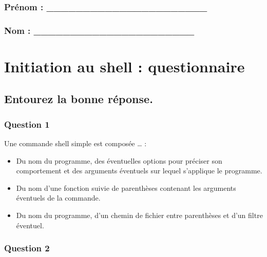 \documentclass[
]{article}
\date{}
\providecommand{\tightlist}{%
  \setlength{\itemsep}{0pt}\setlength{\parskip}{0pt}}
\begin{document}
\hypertarget{pruxe9nom-______________________}{%
\subsubsection{Prénom :
\_\_\_\_\_\_\_\_\_\_\_\_\_\_\_\_\_\_\_\_\_\_}\label{pruxe9nom-______________________}}

\hypertarget{nom-______________________}{%
\subsubsection{Nom :
\_\_\_\_\_\_\_\_\_\_\_\_\_\_\_\_\_\_\_\_\_\_}\label{nom-______________________}}

\hypertarget{initiation-au-shell-questionnaire}{%
\section{Initiation au shell :
questionnaire}\label{initiation-au-shell-questionnaire}}

\hypertarget{entourez-la-bonne-ruxe9ponse.}{%
\subsection{\texorpdfstring{Entourez \textbf{la} bonne
réponse.}{Entourez la bonne réponse.}}\label{entourez-la-bonne-ruxe9ponse.}}

\hypertarget{question-1}{%
\subsubsection{Question 1}\label{question-1}}

Une commande shell simple est composée \ldots{} :

\begin{itemize}
\tightlist
\item
  Du nom du programme, des éventuelles options pour préciser son
  comportement et des arguments éventuels sur lequel s'applique le
  programme.
\item
  Du nom d'une fonction suivie de parenthèses contenant les arguments
  éventuels de la commande.
\item
  Du nom du programme, d'un chemin de fichier entre parenthèses et d'un
  filtre éventuel.
\end{itemize}

\hypertarget{question-2}{%
\subsubsection{Question 2}\label{question-2}}
\end{document}
